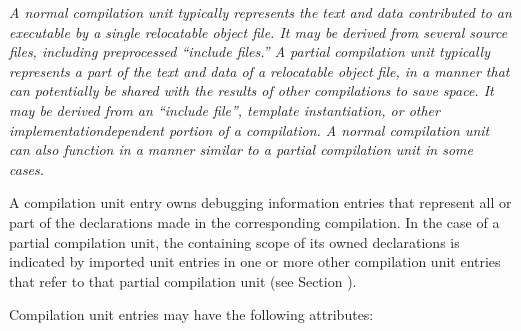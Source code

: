 \textit{A normal compilation unit typically represents the text and
data contributed to an executable by a single relocatable
object file. It may be derived from several source files,
including pre\dash processed ``include files.'' A partial
compilation unit typically represents a part of the text
and data of a relocatable object file, in a manner that can
potentially be shared with the results of other compilations
to save space. It may be derived from an ``include file'',
template instantiation, or other implementation\dash dependent
portion of a compilation. A normal compilation unit can also
function in a manner similar to a partial compilation unit
in some cases.}

A compilation unit entry owns debugging information
entries that represent all or part of the declarations
made in the corresponding compilation. In the case of a
partial compilation unit, the containing scope of its owned
declarations is indicated by imported unit entries in one
or more other compilation unit entries that refer to that
partial compilation unit (see 
Section ).


Compilation unit entries may have the following attributes:

